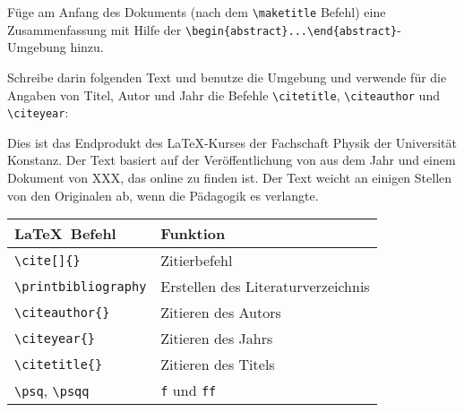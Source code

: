 \documentclass["WS\space 16-17\space -\space LaTeX-Kurs\space -\space Praesentation\space -\space 3.tex"]{subfiles}
\begin{document}
\begin{frame}[fragile]
	\vspace{-0.3cm}
	\begin{Aufgabe}
		Füge am Anfang des Dokuments (nach dem \lstinline[basicstyle=\normalfont\normalsize]|\maketitle| Befehl) eine Zusammenfassung mit Hilfe der \lstinline[basicstyle=\normalfont\normalsize]|\begin{abstract}...\end{abstract}|-Umgebung hinzu.
		
		Schreibe darin folgenden Text und benutze die  Umgebung und verwende für die Angaben von Titel, Autor und Jahr die Befehle \lstinline[basicstyle=\normalfont\normalsize]|\citetitle|, \lstinline[basicstyle=\normalfont\normalsize]|\citeauthor| und \lstinline[basicstyle=\normalfont\normalsize]|\citeyear|:
	\end{Aufgabe}
	\begin{outputbox}
		Dies ist das Endprodukt des \LaTeX-Kurses der Fachschaft Physik der Universität Konstanz. Der Text basiert auf der Veröffentlichung  von \citeauthor{Petard1938} aus dem Jahr \citeyear{Petard1938} \cite[29\psqq]{Weber2013} und einem Dokument von XXX, das online zu finden ist. Der Text weicht an einigen Stellen von den Originalen ab, wenn die Pädagogik es verlangte.
	\end{outputbox}
	\btVFill\Befehle
	\begin{center}
		\begin{tabular}{ll}
			\toprule
			\LaTeX\ Befehl							&	Funktion					\\ \midrule
			\lstinline|\cite[]{}|					&	Zitierbefehl\\
			\lstinline|\printbibliography|			&	Erstellen des Literaturverzeichnis\\
			\lstinline|\citeauthor{}|				&	Zitieren des Autors \\
			\lstinline|\citeyear{}|					&	Zitieren des Jahrs \\
			\lstinline|\citetitle{}|				&	Zitieren des Titels \\
			\lstinline|\psq|, \lstinline|\psqq|		&	\texttt{f} und \texttt{ff} \\
			\bottomrule
		\end{tabular}
	\end{center}
	\vspace{0.1cm}
\end{frame}
\end{document}
